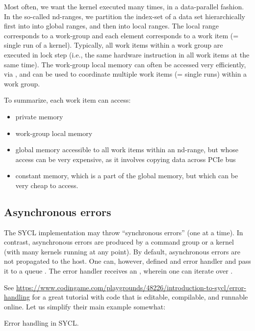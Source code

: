 Most often, we want the kernel executed many times, in a data-parallel fashion. 
In the so-called nd-ranges, we partition the index-set of a data set hierarchically first into into global ranges, and then into local ranges. 
The local range corresponds to a work-group and each element corresponds to a work item (= single run of a kernel). 
Typically, all work items within a work group are executed in lock step (i.e., the same hardware instruction in all work items at the same time).
The work-group local memory can often be accessed very efficiently, via , and can be used to coordinate multiple work items (= single runs) within a work group.

To summarize, each work item can access:
\begin{itemize}
\item private memory
\item work-group local memory
\item global memory accessible to all work items within an nd-range, but whose access can be very expensive, as it involves copying data across PCIe bus
\item constant memory, which is a part of the global memory, but which can be very cheap to access. 
\end{itemize}

\subsection{Asynchronous errors}

The SYCL implementation may throw ``synchronous errors'' (one at a time).
In contrast, asynchronous errors are produced by a command group or a kernel (with many kernels running at any point). By default, asynchronous errors are not propagated to the host. One can, however, defined and error handler and pass it to a queue .
The error handler receives an , wherein one can iterate over .

See \url{https://www.codingame.com/playgrounds/48226/introduction-to-sycl/error-handling} for a great tutorial with code that is editable, compilable, and runnable online. Let us simplify their main example somewhat:

\raggedbottom
\begin{codebox}[]{\href{https://godbolt.org/z/h3aodW99P}{\ExternalLink}}
\footnotesize Error handling in SYCL.
\tcblower
{}
\end{codebox}
  
